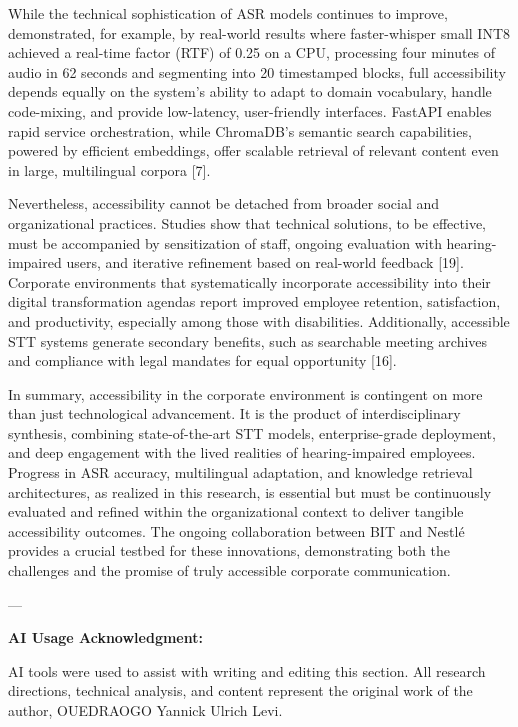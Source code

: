\documentclass[12pt,a4paper]{article}
\begin{document}
While the technical sophistication of ASR models continues to improve, demonstrated, for example, by real-world results where faster-whisper small INT8 achieved a real-time factor (RTF) of 0.25 on a CPU, processing four minutes of audio in 62 seconds and segmenting into 20 timestamped blocks, full accessibility depends equally on the system’s ability to adapt to domain vocabulary, handle code-mixing, and provide low-latency, user-friendly interfaces. FastAPI enables rapid service orchestration, while ChromaDB’s semantic search capabilities, powered by efficient embeddings, offer scalable retrieval of relevant content even in large, multilingual corpora [7].


Nevertheless, accessibility cannot be detached from broader social and organizational practices. Studies show that technical solutions, to be effective, must be accompanied by sensitization of staff, ongoing evaluation with hearing-impaired users, and iterative refinement based on real-world feedback [19]. Corporate environments that systematically incorporate accessibility into their digital transformation agendas report improved employee retention, satisfaction, and productivity, especially among those with disabilities. Additionally, accessible STT systems generate secondary benefits, such as searchable meeting archives and compliance with legal mandates for equal opportunity [16].


In summary, accessibility in the corporate environment is contingent on more than just technological advancement. It is the product of interdisciplinary synthesis, combining state-of-the-art STT models, enterprise-grade deployment, and deep engagement with the lived realities of hearing-impaired employees. Progress in ASR accuracy, multilingual adaptation, and knowledge retrieval architectures, as realized in this research, is essential but must be continuously evaluated and refined within the organizational context to deliver tangible accessibility outcomes. The ongoing collaboration between BIT and Nestlé provides a crucial testbed for these innovations, demonstrating both the challenges and the promise of truly accessible corporate communication.


---


\textbf{AI Usage Acknowledgment:}

AI tools were used to assist with writing and editing this section. All research directions, technical analysis, and content represent the original work of the author, OUEDRAOGO Yannick Ulrich Levi.
\end{document}
